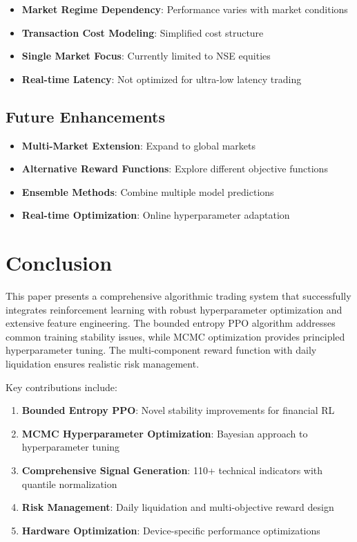 \documentclass[11pt,a4paper]{article}
\begin{document}
\begin{itemize}
    \item \textbf{Market Regime Dependency}: Performance varies with market conditions
    \item \textbf{Transaction Cost Modeling}: Simplified cost structure
    \item \textbf{Single Market Focus}: Currently limited to NSE equities
    \item \textbf{Real-time Latency}: Not optimized for ultra-low latency trading
\end{itemize}

\subsection{Future Enhancements}

\begin{itemize}
    \item \textbf{Multi-Market Extension}: Expand to global markets
    \item \textbf{Alternative Reward Functions}: Explore different objective functions
    \item \textbf{Ensemble Methods}: Combine multiple model predictions
    \item \textbf{Real-time Optimization}: Online hyperparameter adaptation
\end{itemize}

\section{Conclusion}

This paper presents a comprehensive algorithmic trading system that successfully integrates reinforcement learning with robust hyperparameter optimization and extensive feature engineering. The bounded entropy PPO algorithm addresses common training stability issues, while MCMC optimization provides principled hyperparameter tuning. The multi-component reward function with daily liquidation ensures realistic risk management.

Key contributions include:

\begin{enumerate}
    \item \textbf{Bounded Entropy PPO}: Novel stability improvements for financial RL
    \item \textbf{MCMC Hyperparameter Optimization}: Bayesian approach to hyperparameter tuning
    \item \textbf{Comprehensive Signal Generation}: 110+ technical indicators with quantile normalization
    \item \textbf{Risk Management}: Daily liquidation and multi-objective reward design
    \item \textbf{Hardware Optimization}: Device-specific performance optimizations
\end{enumerate}
\end{document}
